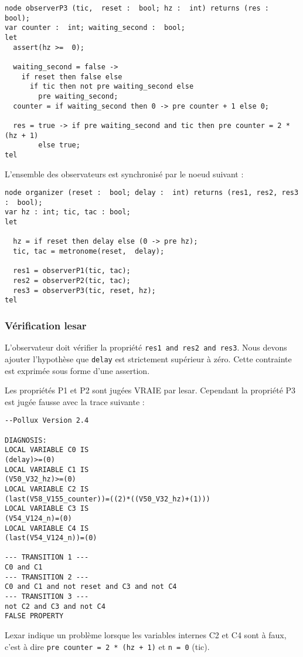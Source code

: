 \documentclass[a4paper]{article}
\begin{document}
\begin{verbatim}
node observerP3 (tic,  reset :  bool; hz :  int) returns (res :  bool);
var counter :  int; waiting_second :  bool;
let
  assert(hz >=  0);

  waiting_second = false ->
    if reset then false else
      if tic then not pre waiting_second else
        pre waiting_second;
  counter = if waiting_second then 0 -> pre counter + 1 else 0;

  res = true -> if pre waiting_second and tic then pre counter = 2 * (hz + 1) 
        else true;
tel
\end{verbatim}

L'ensemble des observateurs est synchronisé par le noeud suivant : 

\begin{verbatim}
node organizer (reset :  bool; delay :  int) returns (res1, res2, res3 :  bool);
var hz : int; tic, tac : bool;
let 
  
  hz = if reset then delay else (0 -> pre hz);
  tic, tac = metronome(reset,  delay);

  res1 = observerP1(tic, tac);
  res2 = observerP2(tic, tac);
  res3 = observerP3(tic, reset, hz);
tel
\end{verbatim}

\subsubsection{Vérification lesar}
L'observateur doit vérifier la propriété \texttt{res1 and res2 and res3}. Nous devons
ajouter l'hypothèse que \texttt{delay} est strictement supérieur à zéro. Cette 
contrainte est exprimée sous forme d'une assertion.

Les propriétés P1 et P2 sont jugées VRAIE par lesar. Cependant la propriété P3 est
jugée fausse avec la trace suivante : 
\begin{verbatim}
--Pollux Version 2.4

DIAGNOSIS:
LOCAL VARIABLE C0 IS
(delay)>=(0)
LOCAL VARIABLE C1 IS
(V50_V32_hz)>=(0)
LOCAL VARIABLE C2 IS
(last(V58_V155_counter))=((2)*((V50_V32_hz)+(1)))
LOCAL VARIABLE C3 IS
(V54_V124_n)=(0)
LOCAL VARIABLE C4 IS
(last(V54_V124_n))=(0)

--- TRANSITION 1 ---
C0 and C1
--- TRANSITION 2 ---
C0 and C1 and not reset and C3 and not C4
--- TRANSITION 3 ---
not C2 and C3 and not C4
FALSE PROPERTY
\end{verbatim}

Lexar indique un problème lorsque les variables internes C2 et C4 sont à faux, 
c'est à dire \texttt{pre counter = 2 * (hz + 1)} et \texttt{n = 0} (tic). 
\end{document}
